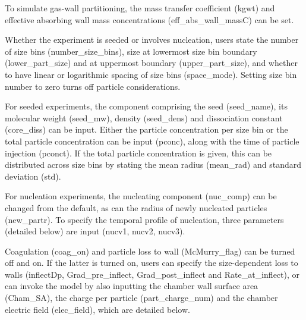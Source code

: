 \documentclass[gmd, manuscript]{copernicus}
\begin{document}
To simulate gas-wall partitioning, the mass transfer coefficient (kgwt) and effective absorbing wall mass concentrations (eff\_abs\_wall\_massC) can be set.

Whether the experiment is seeded or involves nucleation, users state the number of size bins (number\_size\_bins), size at lowermost size bin boundary (lower\_part\_size) and at uppermost boundary (upper\_part\_size), and whether to have linear or logarithmic spacing of size bins (space\_mode).  Setting size bin number to zero turns off particle considerations.

For seeded experiments, the component comprising the seed (seed\_name), its molecular weight (seed\_mw), density (seed\_dens) and dissociation constant (core\_diss) can be input.  Either the particle concentration per size bin or the total particle concentration can be input (pconc), along with the time of particle injection (pconct).  If the total particle concentration is given, this can be distributed across size bins by stating the mean radius (mean\_rad) and standard deviation (std).

For nucleation experiments, the nucleating component (nuc\_comp) can be changed from the default, as can the radius of newly nucleated particles (new\_partr).  To specify the temporal profile of nucleation, three parameters (detailed below) are input (nucv1, nucv2, nucv3).

Coagulation (coag\_on) and particle loss to wall (McMurry\_flag) can be turned off and on.  If the latter is turned on, users can specify the size-dependent loss to walls (inflectDp, Grad\_pre\_inflect, Grad\_post\_inflect and Rate\_at\_inflect), or can invoke the \citet{McMurry1985} model by also inputting the chamber wall surface area (Cham\_SA), the charge per particle (part\_charge\_num) and the chamber electric field (elec\_field), which are detailed below.
\end{document}
